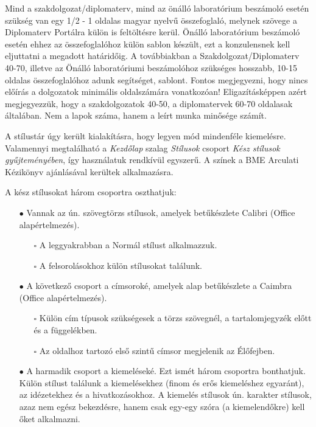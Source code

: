 \documentclass[a4paper, 12pt]{article}
\begin{document}
	Mind a szakdolgozat/diplomaterv, mind az önálló laboratórium beszámoló esetén szükség van egy 1/2 - 1 oldalas magyar nyelvű összefoglaló, melynek szövege a Diplomaterv Portálra külön is feltöltésre kerül.
	Önálló laboratórium beszámoló esetén ehhez az összefoglalóhoz külön sablon készült, ezt a konzulensnek kell eljuttatni a megadott határidőig.
	A továbbiakban a Szakdolgozat/Diplomaterv 40-70, illetve az Önálló laboratóriumi beszámolóhoz szükséges hosszabb, 10-15 oldalas összefoglalóhoz adunk segítséget, sablont.
	Fontos megjegyezni, hogy nincs előírás a dolgozatok minimális oldalszámára vonatkozóan!
	Eligazításképpen azért megjegyezzük, hogy a szakdolgozatok 40-50, a diplomatervek 60-70 oldalasak általában.
	Nem a lapok száma, hanem a leírt munka minősége számít.
	\par
	A stílustár úgy került kialakításra, hogy legyen mód mindenféle kiemelésre.
	Valamennyi megtalálható a \textcolor{bme}{\textit{Kezdőlap}} szalag \textcolor{bme}{\textit{Stílusok}} csoport \textcolor{bme}{\textit{Kész stílusok gyűjteményében}}, így használatuk rendkívül egyszerű.
	A színek a BME Arculati Kézikönyv ajánlásával kerültek alkalmazásra.
	\par
	A kész stílusokat három csoportra oszthatjuk:
	\begin{itemize}
		\item[\textcolor{bme}{$\bullet$}] Vannak az ún. szövegtörzs stílusok, amelyek betűkészlete Calibri (Office alapértelmezés).
		\begin{itemize}
			\item[$\square$] A leggyakrabban a Normál stílust alkalmazzuk.
			\item[$\square$] A felsorolásokhoz külön stílusokat találunk.
		\end{itemize}
		\item[\textcolor{bme}{$\bullet$}] A következő csoport a címsoroké, amelyek alap betűkészlete a Caimbra (Office alapértelmezés).
		\begin{itemize}
			\item[$\square$] Külön cím típusok szükségesek a törzs szövegnél, a tartalomjegyzék előtt és a függelékben.
			\item[$\square$] Az oldalhoz tartozó első szintű címsor megjelenik az Élőfejben.
		\end{itemize}
		\item[\textcolor{bme}{$\bullet$}] A harmadik csoport a kiemeléseké. Ezt ismét három csoportra bonthatjuk. Külön stílust találunk a kiemelésekhez (finom és erős kiemeléshez egyaránt), az idézetekhez és a hivatkozásokhoz. A kiemelés stílusok ún. karakter stílusok, azaz nem egész bekezdésre, hanem csak egy-egy szóra (a kiemelendőkre) kell őket alkalmazni.
	\end{itemize}
\end{document}
